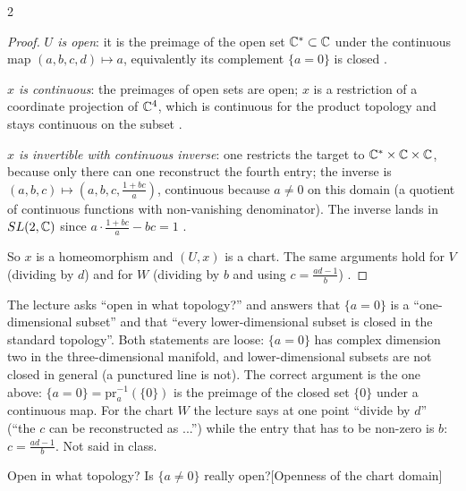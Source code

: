 \begin{paracol}{2}
\begin{proposition}[$(U,x)$ is a chart]
\end{proposition}
\begin{proof}
\emph{$U$ is open}: it is the preimage of the open set $\mathbb{C}^*\subset\mathbb{C}$ under the continuous map $(a,b,c,d)\mapsto a$, equivalently its complement $\{a=0\}$ is closed  .\par
\emph{$x$ is continuous}: the preimages of open sets are open; $x$ is a restriction of a coordinate projection of $\mathbb{C}^4$, which is continuous for the product topology and stays continuous on the subset   .\par
\emph{$x$ is invertible with continuous inverse}: one restricts the target to $\mathbb{C}^*\times\mathbb{C}\times\mathbb{C}$, because only there can one reconstruct the fourth entry; the inverse is $(a,b,c)\mapsto(a,b,c,\frac{1+bc}{a})$, continuous because $a\ne0$ on this domain (a quotient of continuous functions with non-vanishing denominator). The inverse lands in $SL(2,\mathbb{C})$ since $a\cdot\frac{1+bc}{a}-bc=1$      .\par
So $x$ is a homeomorphism and $(U,x)$ is a chart. The same arguments hold for $V$ (dividing by $d$) and for $W$ (dividing by $b$ and using $c=\frac{ad-1}{b}$)        .
\end{proof}
\begin{coursenote}
The lecture asks ``open in what topology?'' and answers that $\{a=0\}$ is a ``one-dimensional subset'' and that ``every lower-dimensional subset is closed in the standard topology''. Both statements are loose: $\{a=0\}$ has complex dimension two in the three-dimensional manifold, and lower-dimensional subsets are not closed in general (a punctured line is not). The correct argument is the one above: $\{a=0\}=\mathrm{pr}_a^{-1}(\{0\})$ is the preimage of the closed set $\{0\}$ under a continuous map. For the chart $W$ the lecture says at one point ``divide by $d$'' (``the $c$ can be reconstructed as ...'') while the entry that has to be non-zero is $b$: $c=\frac{ad-1}{b}$. Not said in class.    
\end{coursenote}
\begin{answer}{Open in what topology? Is $\{a\neq 0\}$ really open?}[Openness of the chart domain]

\end{answer}
\end{paracol}
